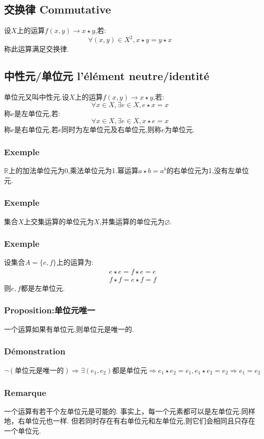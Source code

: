 \documentclass[12pt, a4paper, oneside]{ctexbook}
\begin{document}
  \subsection{交换律 Commutative}
  设$X$上的运算$f(x,y)\rightarrow x\star y $,若:
  $$
  \forall (x,y)\in X^2, x\star y=y\star x
  $$
  称此运算满足交换律.
  \subsection{中性元/单位元 l'élément neutre/identité}
  单位元又叫中性元.设$X$上的运算$f(x,y)\rightarrow x\star y $,若:
  $$
  \forall x\in X, \exists e\in X,e\star x=x
  $$
  称$e$是左单位元,若:
  $$
  \forall x\in X, \exists e\in X,x\star e=x
  $$
  称$e$是右单位元,若$e$同时为左单位元及右单位元,则称$e$为单位元.
  \subsubsection{Exemple}
  $\mathbb{R} $上的加法单位元为0,乘法单位元为1.幂运算$a\star b=a^b$的右单位元为1,没有左单位元.
  \subsubsection{Exemple}
  集合$X$上交集运算的单位元为$X$,并集运算的单位元为$\varnothing $.
  \subsubsection{Exemple}
  设集合$A=\{e,f\}$上的运算为:
  $$
    \begin{aligned}&
    e\star e=f\star e=e\\&
    f\star f=e\star f=f
  \end{aligned}
  $$则$e,f$都是左单位元.
  \subsubsection{Proposition:单位元唯一}
  一个运算如果有单位元,则单位元是唯一的.
  \subsubsection{Démonstration}
  $\lnot (\text{单位元是唯一的})\Rightarrow \exists (e_1,e_2)\text{都是单位元}\Rightarrow e_1\star e_2=e_1,e_1\star e_2=e_2\Rightarrow e_1=e_2$
  \subsubsection{Remarque}
  一个运算有若干个左单位元是可能的.
  事实上，每一个元素都可以是左单位元.同样地，右单位元也一样.
  但若同时存在有右单位元和左单位元,则它们会相同且只存在一个单位元.
  
\end{document}
